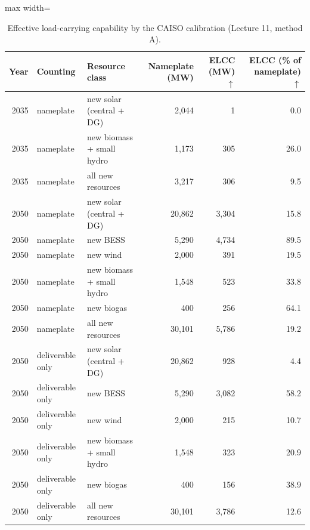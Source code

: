 \begin{table}[!htbp]
\centering
\scriptsize
\caption{Effective load-carrying capability by the CAISO calibration (Lecture 11, method A).}
\label{tab:elcc}
\begin{adjustbox}{max width=\linewidth}
\begin{tabular}{rllrrr}
\toprule
Year & Counting & Resource class & Nameplate (MW) & ELCC (MW) $\uparrow$ & ELCC (\% of nameplate) $\uparrow$ \\
\midrule
2035 & nameplate & new solar (central + DG) & 2,044 & 1 & 0.0 \\
2035 & nameplate & new biomass + small hydro & 1,173 & 305 & 26.0 \\
2035 & nameplate & all new resources & 3,217 & 306 & 9.5 \\
2050 & nameplate & new solar (central + DG) & 20,862 & 3,304 & 15.8 \\
2050 & nameplate & new BESS & 5,290 & 4,734 & 89.5 \\
2050 & nameplate & new wind & 2,000 & 391 & 19.5 \\
2050 & nameplate & new biomass + small hydro & 1,548 & 523 & 33.8 \\
2050 & nameplate & new biogas & 400 & 256 & 64.1 \\
2050 & nameplate & all new resources & 30,101 & 5,786 & 19.2 \\
2050 & deliverable only & new solar (central + DG) & 20,862 & 928 & 4.4 \\
2050 & deliverable only & new BESS & 5,290 & 3,082 & 58.2 \\
2050 & deliverable only & new wind & 2,000 & 215 & 10.7 \\
2050 & deliverable only & new biomass + small hydro & 1,548 & 323 & 20.9 \\
2050 & deliverable only & new biogas & 400 & 156 & 38.9 \\
2050 & deliverable only & all new resources & 30,101 & 3,786 & 12.6 \\
\bottomrule
\end{tabular}
\end{adjustbox}
\end{table}
